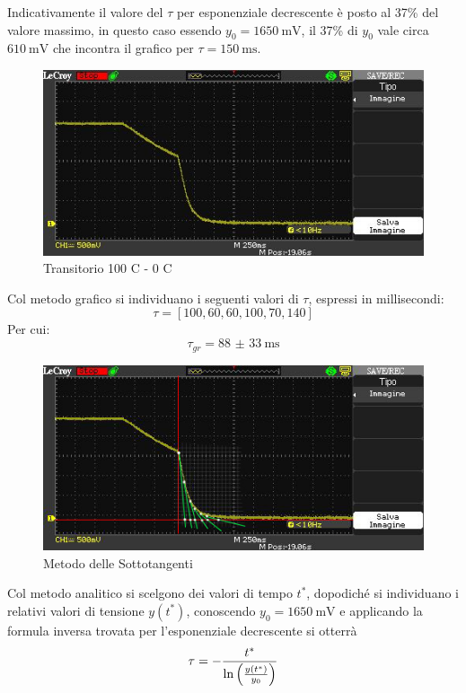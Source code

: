 \documentclass[a4paper, 12pt, twoside]{report}
\begin{document}
		Indicativamente il valore del $\tau$ per esponenziale decrescente è posto al 37\% del valore massimo, in questo caso essendo $y_0 = \SI{1650}{\milli\volt}$, il 37\% di $y_0$ vale circa $\SI{610}{\milli\volt}$ che incontra il grafico per $\tau=\SI{150}{\milli\second}$.		
		\begin{figure}[H]
			\centering
			\includegraphics[width=0.7\linewidth]{immaginioscillo/3}
			\caption{Transitorio 100 \degree C - 0 \degree C}
			\label{fig:5}
		\end{figure}		
		Col metodo grafico si individuano i seguenti valori di $\tau$, espressi in millisecondi:
		\[ \tau = [100, 60, 60, 100, 70, 140]\]
		Per cui:
		\[\tau_{gr} = \SI[separate-uncertainty = true]{88(33)}{\milli\second}\]		
		\begin{figure}[H]
			\centering
			\includegraphics[width=0.7\linewidth]{immaginioscillo/3+}
			\caption{Metodo delle Sottotangenti}
			\label{fig:6}
		\end{figure}		
		Col metodo analitico si scelgono dei valori di tempo $t^*$, dopodiché si individuano i relativi valori di tensione $y(t^*)$, conoscendo $y_0 = \SI{1650}{\milli\volt}$ e applicando la formula inversa trovata per l'esponenziale decrescente si otterrà
		\[\tau = - \dfrac{t^*}{\ln\left(y(t^*)\over y_0\right)} \]		
\end{document}
